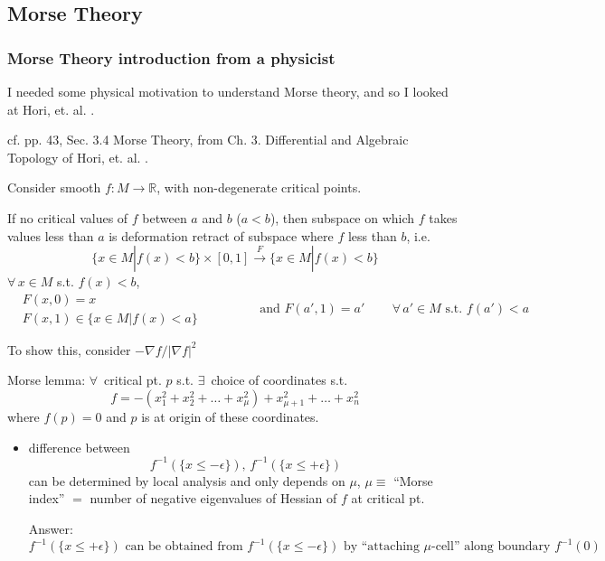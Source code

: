 \documentclass[10pt]{amsart}
\begin{document}
\begin{multicols*}{2}
\part{Morse Theory}

\section{Morse Theory introduction from a physicist}

I needed some physical motivation to understand Morse theory, and so I looked at Hori, et. al. \cite{Hori2003}.  

cf. pp. 43, Sec. 3.4 Morse Theory, from Ch. 3. Differential and Algebraic Topology of Hori, et. al. \cite{Hori2003}.

Consider smooth $f:M \to \mathbb{R}$, with non-degenerate critical points.

If no critical values of $f$ between $a$ and $b$ ($a<b$), then subspace on which $f$ takes values less than $a$ is deformation retract of subspace where $f$ less than $b$, i.e.
\[
\lbrace x \in M | f(x) < b\rbrace \times [0,1] \xrightarrow{ F } \lbrace x \in M | f(x) < b\rbrace
\]
$\forall \, x \in M$ s.t. $f(x) < b$,
\[
\begin{aligned}
  & F(x,0)  = x \\
  & F(x,1) \in \lbrace x \in M | f(x) < a \rbrace 
  \end{aligned} \qquad \qquad \, \text{ and } F(a',1) = a' \qquad \, \forall \, a' \in M \text{ s.t. } f(a') < a
\]

To show this, consider $-\nabla f/|\nabla f|^2$

Morse lemma: $\forall \, $ critical pt. $p$ s.t. $\exists \, $ choice of coordinates s.t.
\begin{equation}
  f  = - (x_1^2 + x_2^2 + \dots + x_{\mu}^2) + x_{\mu + 1}^2 + \dots + x_n^2
\end{equation}
where $f(p)=0$ and $p$ is at origin of these coordinates.

\begin{itemize}
\item difference between
  \[
f^{-1}(\lbrace x \leq -\epsilon \rbrace) , \, f^{-1}(\lbrace x \leq + \epsilon \rbrace)
\]
can be determined by local analysis and only depends on $\mu$, $\mu \equiv $ ``Morse index'' $=$ number of negative eigenvalues of Hessian of $f$ at critical pt.

Answer: \\

\[
f^{-1}(\lbrace x \leq + \epsilon \rbrace) \text{ can be obtained from } f^{-1}(\lbrace x \leq -\epsilon \rbrace) \text{ by ``attaching $\mu$-cell'' along boundary $f^{-1}(0)$ }
\]


\end{itemize}
\end{multicols*}
\end{document}
